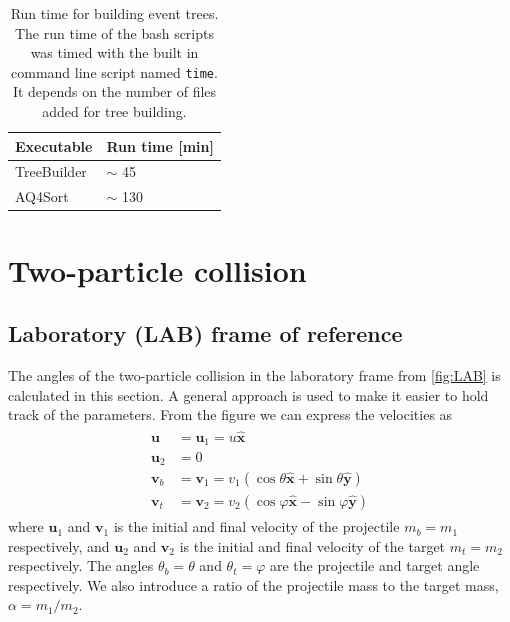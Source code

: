 \documentclass[twoside,english]{uiofysmaster/uiofysmaster}
\begin{document}
\begin{appendices}
\begin{table}[H] 
	\centering 
	\caption{Run time for building event trees. The run time of the bash scripts was timed with the built in command line script named \texttt{time}. It depends on the number of files added for tree building.}
	\label{tab:run_time}
	\begin{tabular}{ll}
		\hline
		Executable   &  Run time [min] \\
		\hline
		TreeBuilder  &  $\sim$ 45   \\
		AQ4Sort       &  $\sim$ 130  \\
		\hline
	\end{tabular}
\end{table}



\chapter{Two-particle collision}
\section{Laboratory (LAB) frame of reference}\label{sec:LAB}
The angles of the two-particle collision in the laboratory frame from \autoref{fig:LAB} is calculated in this section. A general approach is used to make it easier to hold track of the parameters. From the figure we can express the velocities as
\begin{align}\label{eq:2p-LAB-collision}
\begin{split}
	 \boldsymbol{u} &= \boldsymbol{u}_1 = u \boldsymbol{\hat{x}}  \\
	 \boldsymbol{u}_2 &= 0  \\
	 \boldsymbol{v}_b &= \boldsymbol{v}_1 = v_1 (\cos \theta \boldsymbol{\hat{x}} + \sin \theta \boldsymbol{\hat{y}})  \\
	\boldsymbol{v}_t &= \boldsymbol{v}_2 = v_2 (\cos \varphi \boldsymbol{\hat{x}} - \sin \varphi \boldsymbol{\hat{y}})
\end{split}
\end{align}
where $\boldsymbol{u}_1$ and $\boldsymbol{v}_1$ is the initial and final velocity of the projectile $m_b = m_1$ respectively, and $\boldsymbol{u}_2$ and $\boldsymbol{v}_2$ is the initial and final velocity of the target $m_t = m_2$ respectively. The angles $\theta_b = \theta$ and $\theta_t = \varphi$ are the projectile and target angle respectively. We also introduce a ratio of the projectile mass to the target mass, $\alpha = m_1/m_2$.


\end{appendices}
\end{document}
